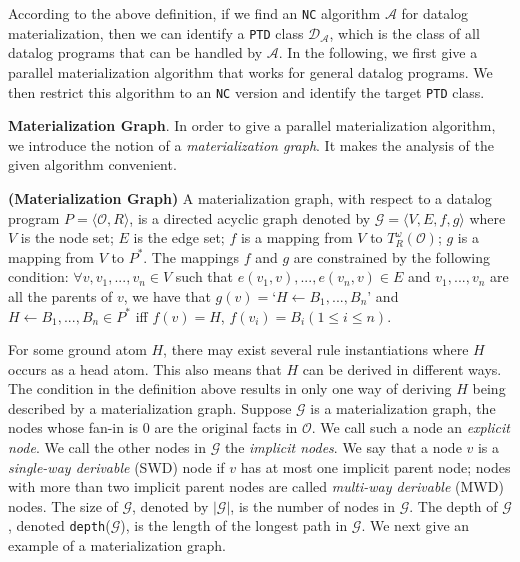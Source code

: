 \documentclass{article}
\begin{document}
According to the above definition, if we find an \texttt{NC} algorithm $\mathcal{A}$ for datalog materialization, then
we can identify a \texttt{PTD} class $\mathcal{D}_{\mathcal{A}}$, which is the class of all datalog programs
that can be handled by $\mathcal{A}$. In the following, we first give a parallel materialization algorithm that works for general datalog programs. We then restrict this algorithm to an \texttt{NC} version and identify the target \texttt{PTD} class.

\textbf{Materialization Graph}. In order to give a parallel materialization algorithm, we introduce the notion of a \emph{materialization graph}. It makes the analysis of the given algorithm convenient.

\begin{definition}
\textbf{(Materialization Graph)}\label{def:mg} A materialization graph, with respect to
a datalog program $P=\langle\mathcal{O}, R\rangle$, is a directed acyclic graph
denoted by $\mathcal{G}=\langle V, E, f, g\rangle$ where $V$ is the node set;
$E$ is the edge set; $f$ is a mapping from $V$ to $T_R^{\omega}(\mathcal{O})$;
$g$ is a mapping from $V$ to $P^*$. The mappings $f$ and $g$ are constrained by the following condition:
$\forall v,v_1,...,v_n\in V$ such that $e(v_1, v),...,e(v_n, v)\in E$ and $v_1,...,v_n$ are all the parents of $v$, we have that $g(v)=$`$H\leftarrow B_1,...,B_n$' and $H\leftarrow B_1,...,B_n\in P^*$ iff $f(v)=H$, $f(v_i)=B_i (1\leq i\leq n)$.
\end{definition}

For some ground atom $H$, there may exist several rule instantiations where $H$ occurs as a head atom. This also means that
$H$ can be derived in different ways. The condition in the definition above results in only one way of deriving $H$ being described by a materialization graph.
Suppose $\mathcal{G}$ is a materialization graph, the nodes whose fan-in is 0 are the original facts in $\mathcal{O}$. We call such a node an \emph{explicit node}. We call the other nodes in $\mathcal{G}$ the \emph{implicit nodes}. We say that a node
$v$ is a \emph{single-way derivable} (SWD) node if $v$ has at most one implicit parent
node; nodes with more than two implicit parent
nodes are called \emph{multi-way derivable} (MWD) nodes. The size of $\mathcal{G}$,
denoted by $|\mathcal{G}|$, is the number of nodes in $\mathcal{G}$. The depth of $\mathcal{G}$, denoted \texttt{depth}($\mathcal{G}$), is the length of the longest path in $\mathcal{G}$. We next give an example of a materialization graph.\\
\end{document}
